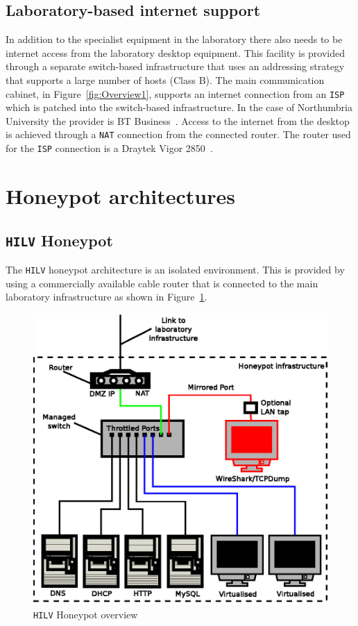 \subsection{Laboratory-based internet support}
In addition to the specialist equipment in the laboratory there also needs to be internet access from the laboratory desktop equipment. This facility is provided through a separate switch-based infrastructure that uses an addressing strategy that supports a large number of hosts (Class B). The main communication cabinet, in Figure~\ref{fig:Overview1}, supports an internet connection from an \texttt{ISP} which is patched into the switch-based infrastructure. In the case of Northumbria University the provider is BT Business~\cite{BT:17}. Access to the internet from the desktop is achieved through a \texttt{NAT} connection from the connected router. The router used for the \texttt{ISP} connection is a Draytek Vigor 2850~\cite{DC:17}.

\section{Honeypot architectures}

\subsection{\texttt{HILV} Honeypot}

The \texttt{HILV} honeypot architecture is an isolated environment. This is provided by using a commercially available cable router that is connected to the main laboratory infrastructure as shown in Figure~\ref{fig:HPOverview}. 

\begin{figure}[!ht]
\begin{center}
	\includegraphics[scale=0.70]{Images/Honeypot1.eps}
\caption{\texttt{HILV} Honeypot overview}
\label{fig:HPOverview}
\end{center}
\end{figure}

